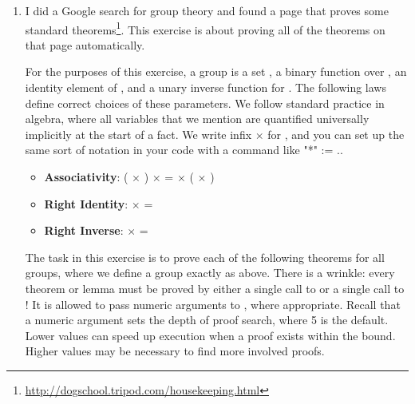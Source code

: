 \documentclass[12pt]{report}
\begin{document}
 \begin{enumerate}


\item I did a Google search for group theory and found a page that proves some standard theorems\footnote{\url{http://dogschool.tripod.com/housekeeping.html}}.  This exercise is about proving all of the theorems on that page automatically.


  For the purposes of this exercise, a group is a set , a binary function  over , an identity element  of , and a unary inverse function  for .  The following laws define correct choices of these parameters.  We follow standard practice in algebra, where all variables that we mention are quantified universally implicitly at the start of a fact.  We write infix \ensuremath{\times} for , and you can set up the same sort of notation in your code with a command like  "*" := ..


  \begin{itemize}
    \item \textbf{Associativity}: ( \ensuremath{\times} ) \ensuremath{\times}  =  \ensuremath{\times} ( \ensuremath{\times} )
    \item \textbf{Right Identity}:  \ensuremath{\times}  = 
    \item \textbf{Right Inverse}:  \ensuremath{\times}   = 
  \end{itemize}


  The task in this exercise is to prove each of the following theorems for all groups, where we define a group exactly as above.  There is a wrinkle: every theorem or lemma must be proved by either a single call to  or a single call to !  It is allowed to pass numeric arguments to , where appropriate.  Recall that a numeric argument sets the depth of proof search, where 5 is the default.  Lower values can speed up execution when a proof exists within the bound.  Higher values may be necessary to find more involved proofs.



\end{enumerate}
\end{document}
